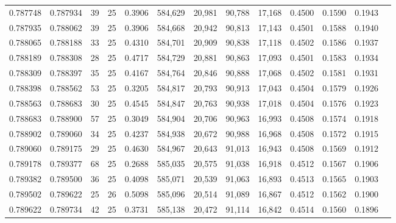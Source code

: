 \begin{tabular}{rrrrrrrrrrrrr}
0.787748 & 0.787934 &    39 &  25 &                                     0.3906 & 584,629 &  20,981 &  90,788 &  17,168 & 0.4500 & 0.1590 & 0.1943 \\
0.787935 & 0.788062 &    39 &  25 &                                     0.3906 & 584,668 &  20,942 &  90,813 &  17,143 & 0.4501 & 0.1588 & 0.1940 \\
0.788065 & 0.788188 &    33 &  25 &                                     0.4310 & 584,701 &  20,909 &  90,838 &  17,118 & 0.4502 & 0.1586 & 0.1937 \\
0.788189 & 0.788308 &    28 &  25 &                                     0.4717 & 584,729 &  20,881 &  90,863 &  17,093 & 0.4501 & 0.1583 & 0.1934 \\
0.788309 & 0.788397 &    35 &  25 &                                     0.4167 & 584,764 &  20,846 &  90,888 &  17,068 & 0.4502 & 0.1581 & 0.1931 \\
0.788398 & 0.788562 &    53 &  25 &                                     0.3205 & 584,817 &  20,793 &  90,913 &  17,043 & 0.4504 & 0.1579 & 0.1926 \\
0.788563 & 0.788683 &    30 &  25 &                                     0.4545 & 584,847 &  20,763 &  90,938 &  17,018 & 0.4504 & 0.1576 & 0.1923 \\
0.788683 & 0.788900 &    57 &  25 &                                     0.3049 & 584,904 &  20,706 &  90,963 &  16,993 & 0.4508 & 0.1574 & 0.1918 \\
0.788902 & 0.789060 &    34 &  25 &                                     0.4237 & 584,938 &  20,672 &  90,988 &  16,968 & 0.4508 & 0.1572 & 0.1915 \\
0.789060 & 0.789175 &    29 &  25 &                                     0.4630 & 584,967 &  20,643 &  91,013 &  16,943 & 0.4508 & 0.1569 & 0.1912 \\
0.789178 & 0.789377 &    68 &  25 &                                     0.2688 & 585,035 &  20,575 &  91,038 &  16,918 & 0.4512 & 0.1567 & 0.1906 \\
0.789382 & 0.789500 &    36 &  25 &                                     0.4098 & 585,071 &  20,539 &  91,063 &  16,893 & 0.4513 & 0.1565 & 0.1903 \\
0.789502 & 0.789622 &    25 &  26 &                                     0.5098 & 585,096 &  20,514 &  91,089 &  16,867 & 0.4512 & 0.1562 & 0.1900 \\
0.789622 & 0.789734 &    42 &  25 &                                     0.3731 & 585,138 &  20,472 &  91,114 &  16,842 & 0.4514 & 0.1560 & 0.1896 \\

\end{tabular}
